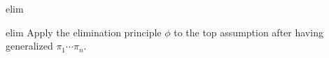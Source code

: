 \begin{tactic}{elim}
  \begin{tsyntax}[empty]{elim}
  Apply the elimination principle $\phi$ to the top assumption after
  having generalized $\pi_1 \cdots \pi_n$.
  \end{tsyntax}
\end{tactic}
